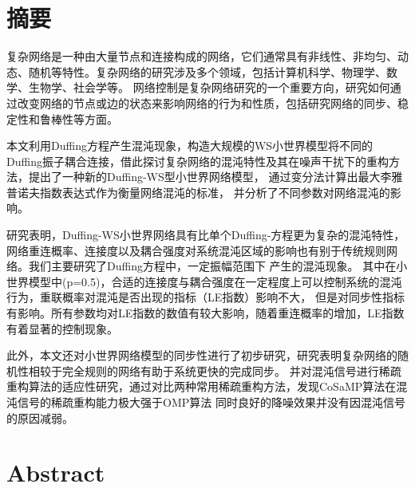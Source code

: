 \maketitle%
\MAKETITLE%

\intobmk\chapter*{摘\quad 要}%
\setcounter{page}{1}%
复杂网络是一种由大量节点和连接构成的网络，它们通常具有非线性、非均匀、动态、随机等特性。复杂网络的研究涉及多个领域，包括计算机科学、物理学、数学、生物学、社会学等。
网络控制是复杂网络研究的一个重要方向，研究如何通过改变网络的节点或边的状态来影响网络的行为和性质，包括研究网络的同步、稳定性和鲁棒性等方面。\par
本文利用Duffing方程产生混沌现象，构造大规模的WS小世界模型将不同的Duffing振子耦合连接，借此探讨复杂网络的混沌特性及其在噪声干扰下的重构方法，提出了一种新的Duffing-WS型小世界网络模型，
通过变分法计算出最大李雅普诺夫指数表达式作为衡量网络混沌的标准，
并分析了不同参数对网络混沌的影响。\par
研究表明，Duffing-WS小世界网络具有比单个Duffing-方程更为复杂的混沌特性，
网络重连概率、连接度以及耦合强度对系统混沌区域的影响也有别于传统规则网络。我们主要研究了Duffing方程中，一定振幅范围下
产生的混沌现象。
其中在小世界模型中(p=0.5)，合适的连接度与耦合强度在一定程度上可以控制系统的混沌行为，重联概率对混沌是否出现的指标（LE指数）影响不大，
但是对同步性指标有影响。所有参数均对LE指数的数值有较大影响，随着重连概率的增加，LE指数有着显著的控制现象。\par
此外，本文还对小世界网络模型的同步性进行了初步研究，研究表明复杂网络的随机性相较于完全规则的网络有助于系统更快的完成同步。
并对混沌信号进行稀疏重构算法的适应性研究，通过对比两种常用稀疏重构方法，发现CoSaMP算法在混沌信号的稀疏重构能力极大强于OMP算法
同时良好的降噪效果并没有因混沌信号的原因减弱。
\par {}%
\intobmk\chapter*{Abstract}%

